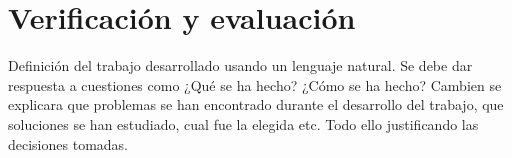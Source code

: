 \chapter{Verificaci\'{o}n y evaluaci\'{o}n}
Definición del trabajo desarrollado usando un lenguaje natural. 
Se debe dar respuesta a cuestiones como ¿Qué se ha hecho? 
¿Cómo se ha hecho? Cambien se explicara que problemas se han 
encontrado durante el desarrollo del trabajo, que soluciones 
se han estudiado, cual fue la elegida etc. Todo ello 
justificando las decisiones tomadas.